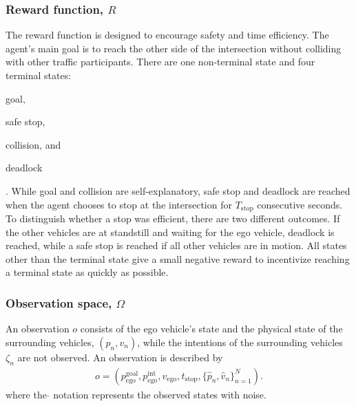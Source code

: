 \subsubsection{Reward function, $R$}
\label{sec:reward}
The reward function is designed to encourage safety and time efficiency. The agent's main goal is to reach the other side of the intersection without colliding with other traffic participants. There are one non-terminal state and four terminal states: 
\begin{enumerate*}[label=(\roman*)] 
\item goal, 
\item safe stop, 
\item collision, and 
\item deadlock 
\end{enumerate*}. 
While goal and collision are self-explanatory, safe stop and deadlock are reached when the agent chooses to stop at the intersection for $T_\mathrm{stop}$ consecutive seconds. To distinguish whether a stop was efficient, there are two different outcomes. If the other vehicles are at standstill and waiting for the ego vehicle, deadlock is reached, while a safe stop is reached if all other vehicles are in motion. All states other than the terminal state give a small negative reward to incentivize reaching a terminal state as quickly as possible. 

\subsubsection{Observation space, $\Omega$}
\label{sec:observation_space}
An observation $o$ consists of the ego vehicle's state and the physical state of the surrounding vehicles, $(p_n, v_n)$, while the intentions of the surrounding vehicles $\zeta_n$ are not observed. An observation is described by
\begin{align}
    \label{eq:observation}
    o = (p_\mathrm{ego}^\mathrm{goal},p_\mathrm{ego}^\mathrm{int}, v_\mathrm{ego}, t_\mathrm{stop}, \{\hat{p}_{n}, \hat{v}_n\}_{n=1}^N).
\end{align}
where the $\hat{}$ notation represents the observed states with noise.

